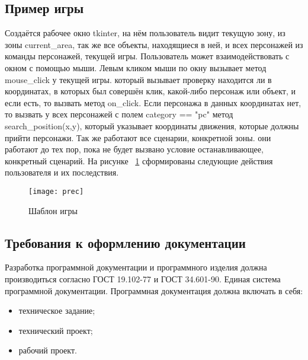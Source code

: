 \subsection{Пример игры}
Создаётся рабочее окно tkinter, на нём пользователь видит текущую зону, из зоны current\_area, так же все объекты, находящиеся в ней, и всех персонажей из команды персонажей, текущей игры. Пользователь может взаимодействовать с окном с помощью мыши. Левым кликом мыши по окну вызывает метод mouse\_click у текущей игры. который вызывает проверку находится ли в координатах, в которых был совершён клик, какой-либо персонаж или объект, и если есть, то вызвать метод on\_click. Если персонажа в данных координатах нет, то вызвать у всех персонажей с полем category == "pc" метод search\_position(x,y), который указывает координаты движения, которые должны прийти персонажи. Так же работают все сценарии, конкретной зоны. они работают до тех пор, пока не будет вызвано условие останавливающее, конкретный сценарий.
На рисунке ~\ref{prec:image} сформированы следующие действия пользователя и их последствия.
\begin{figure}[H]
	\texttt{[image: prec]}
	\caption{Шаблон игры}
	\label{prec:image}
\end{figure}

\subsection{Требования к оформлению документации}

Разработка программной документации и программного изделия должна производиться согласно ГОСТ 19.102-77 и ГОСТ 34.601-90. Единая система программной документации.
Программная документация должна включать в себя:
\begin{itemize}
	\item техническое задание;
	\item технический проект;
	\item рабочий проект.
\end{itemize}